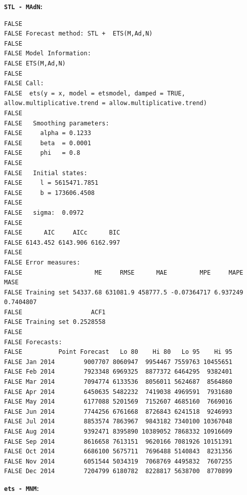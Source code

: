 \documentclass[openany]{book}
\begin{document}
\textbf{\texttt{STL\ -\ MAdN}:}

\begin{verbatim}
FALSE 
FALSE Forecast method: STL +  ETS(M,Ad,N)
FALSE 
FALSE Model Information:
FALSE ETS(M,Ad,N) 
FALSE 
FALSE Call:
FALSE  ets(y = x, model = etsmodel, damped = TRUE, allow.multiplicative.trend = allow.multiplicative.trend) 
FALSE 
FALSE   Smoothing parameters:
FALSE     alpha = 0.1233 
FALSE     beta  = 0.0001 
FALSE     phi   = 0.8 
FALSE 
FALSE   Initial states:
FALSE     l = 5615471.7851 
FALSE     b = 173606.4508 
FALSE 
FALSE   sigma:  0.0972
FALSE 
FALSE      AIC     AICc      BIC 
FALSE 6143.452 6143.906 6162.997 
FALSE 
FALSE Error measures:
FALSE                    ME     RMSE      MAE         MPE     MAPE      MASE
FALSE Training set 54337.68 631081.9 458777.5 -0.07364717 6.937249 0.7404807
FALSE                   ACF1
FALSE Training set 0.2528558
FALSE 
FALSE Forecasts:
FALSE          Point Forecast   Lo 80    Hi 80   Lo 95    Hi 95
FALSE Jan 2014        9007707 8060947  9954467 7559763 10455651
FALSE Feb 2014        7923348 6969325  8877372 6464295  9382401
FALSE Mar 2014        7094774 6133536  8056011 5624687  8564860
FALSE Apr 2014        6450635 5482232  7419038 4969591  7931680
FALSE May 2014        6177088 5201569  7152607 4685160  7669016
FALSE Jun 2014        7744256 6761668  8726843 6241518  9246993
FALSE Jul 2014        8853574 7863967  9843182 7340100 10367048
FALSE Aug 2014        9392471 8395890 10389052 7868332 10916609
FALSE Sep 2014        8616658 7613151  9620166 7081926 10151391
FALSE Oct 2014        6686100 5675711  7696488 5140843  8231356
FALSE Nov 2014        6051544 5034319  7068769 4495832  7607255
FALSE Dec 2014        7204799 6180782  8228817 5638700  8770899
\end{verbatim}

\textbf{\texttt{ets\ -\ MNM}:}
\end{document}
